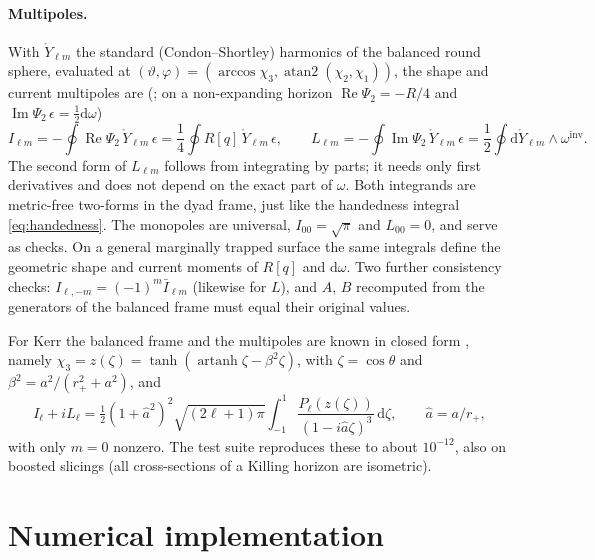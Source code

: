 \documentclass[11pt]{article}
\newcommand{\dd}{\mathrm{d}}
\newcommand{\atantwo}{\operatorname{atan2}}
\newcommand{\artanh}{\operatorname{artanh}}
\begin{document}
\paragraph{Multipoles.}
With $\mathring Y_{\ell m}$ the standard (Condon--Shortley) harmonics of the
balanced round sphere, evaluated at
$(\vartheta,\varphi) = (\arccos\chi_3, \atantwo(\chi_2,\chi_1))$, the
shape and current multipoles are (\cite{akkl2022,glc2026}; on a
non-expanding horizon $\operatorname{Re}\Psi_2 = -R/4$ and
$\operatorname{Im}\Psi_2\,\epsilon = \tfrac12\dd\omega$)
\begin{equation*}
  I_{\ell m} = -\oint \operatorname{Re}\Psi_2\,\mathring Y_{\ell m}\,\epsilon
             = \frac14\oint R[q]\,\mathring Y_{\ell m}\,\epsilon ,
  \qquad
  L_{\ell m} = -\oint \operatorname{Im}\Psi_2\,\mathring Y_{\ell m}\,\epsilon
             = \frac12\oint \dd\mathring Y_{\ell m}\wedge\omega^{\mathrm{inv}} .
\end{equation*}
The second form of $L_{\ell m}$ follows from integrating by parts; it needs
only first derivatives and does not depend on the exact part of $\omega$.
Both integrands are metric-free two-forms in the dyad frame, just like the
handedness integral \eqref{eq:handedness}.  The monopoles are universal,
$I_{00} = \sqrt\pi$ and $L_{00} = 0$, and serve as checks.  On a general
marginally trapped surface the same integrals define the geometric shape and
current moments of $R[q]$ and $\dd\omega$.  Two further consistency checks:
$I_{\ell,-m} = (-1)^m\bar I_{\ell m}$ (likewise for $L$), and $A$, $B$
recomputed from the generators of the balanced frame must equal their
original values.

For Kerr the balanced frame and the multipoles are known in closed
form \cite{glc2026}, namely
$\chi_3 = z(\zeta) = \tanh(\artanh\zeta - \beta^2\zeta)$, with
$\zeta = \cos\theta$ and $\beta^2 = a^2/(r_+^2+a^2)$, and
\begin{equation*}
  I_\ell + iL_\ell = \tfrac12 (1+\hat a^2)^2\sqrt{(2\ell+1)\pi}
  \int_{-1}^{1} \frac{P_\ell(z(\zeta))}{(1-i\hat a\zeta)^3}\,\dd\zeta ,
  \qquad \hat a = a/r_+ ,
\end{equation*}
with only $m=0$ nonzero.  The test suite reproduces these to about
$10^{-12}$, also on boosted slicings (all cross-sections of a Killing horizon
are isometric).

\section{Numerical implementation}
\label{sec:numerics}
\end{document}
